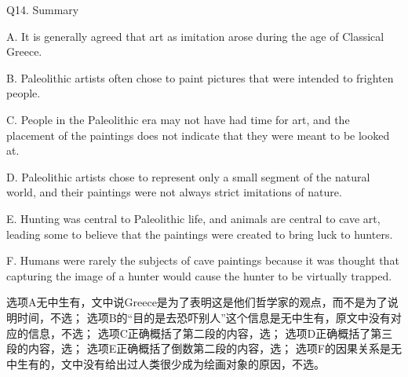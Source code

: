 \begin{blk}
    \begin{qst}
        Q14. Summary
    \end{qst}

    \begin{chc}
        A. It is generally agreed that art as imitation arose during the age of Classical Greece.

        B. Paleolithic artists often chose to paint pictures that were intended to frighten people.

        C. People in the Paleolithic era may not have had time for art, and the placement of the paintings does not indicate that they were meant to be looked at.

        D. Paleolithic artists chose to represent only a small segment of the natural world, and their paintings were not always strict imitations of nature.

        E. Hunting was central to Paleolithic life, and animals are central to cave art, leading some to believe that the paintings were created to bring luck to hunters.

        F. Humans were rarely the subjects of cave paintings because it was thought that capturing the image of a hunter would cause the hunter to be virtually trapped.
    \end{chc}

    \begin{nlz}
        选项A无中生有，文中说Greece是为了表明这是他们哲学家的观点，而不是为了说明时间，不选； 选项B的“目的是去恐吓别人”这个信息是无中生有，原文中没有对应的信息，不选； 选项C正确概括了第二段的内容，选； 选项D正确概括了第三段的内容，选； 选项E正确概括了倒数第二段的内容，选； 选项F的因果关系是无中生有的，文中没有给出过人类很少成为绘画对象的原因，不选。
    \end{nlz}
\end{blk}
